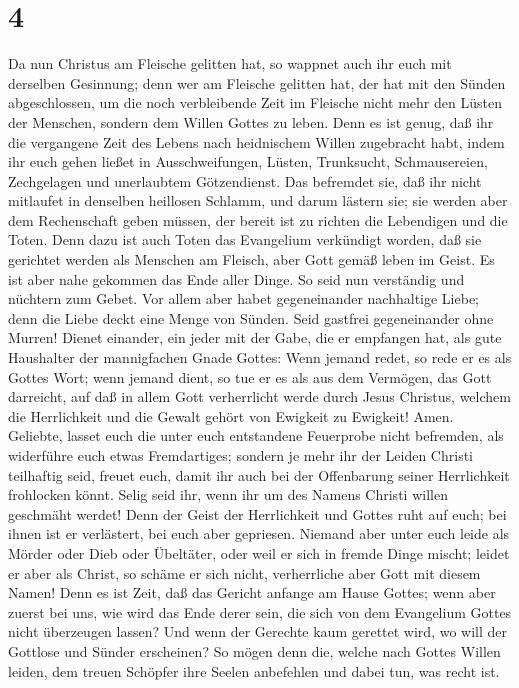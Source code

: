 \hypertarget{section-3}{%
\section{4}\label{section-3}}

 Da nun Christus am Fleische gelitten hat, so wappnet auch
ihr euch mit derselben Gesinnung; denn wer am Fleische gelitten hat, der
hat mit den Sünden abgeschlossen,  um die noch
verbleibende Zeit im Fleische nicht mehr den Lüsten der Menschen,
sondern dem Willen Gottes zu leben.  Denn es ist genug,
daß ihr die vergangene Zeit des Lebens nach heidnischem Willen
zugebracht habt, indem ihr euch gehen ließet in Ausschweifungen, Lüsten,
Trunksucht, Schmausereien, Zechgelagen und unerlaubtem Götzendienst.
 Das befremdet sie, daß ihr nicht mitlaufet in denselben
heillosen Schlamm, und darum lästern sie;  sie werden aber
dem Rechenschaft geben müssen, der bereit ist zu richten die Lebendigen
und die Toten.  Denn dazu ist auch Toten das Evangelium
verkündigt worden, daß sie gerichtet werden als Menschen am Fleisch,
aber Gott gemäß leben im Geist.  Es ist aber nahe gekommen
das Ende aller Dinge. So seid nun verständig und nüchtern zum Gebet.
 Vor allem aber habet gegeneinander nachhaltige Liebe;
denn die Liebe deckt eine Menge von Sünden.  Seid gastfrei
gegeneinander ohne Murren!  Dienet einander, ein jeder
mit der Gabe, die er empfangen hat, als gute Haushalter der mannigfachen
Gnade Gottes:  Wenn jemand redet, so rede er es als
Gottes Wort; wenn jemand dient, so tue er es als aus dem Vermögen, das
Gott darreicht, auf daß in allem Gott verherrlicht werde durch Jesus
Christus, welchem die Herrlichkeit und die Gewalt gehört von Ewigkeit zu
Ewigkeit! Amen.  Geliebte, lasset euch die unter euch
entstandene Feuerprobe nicht befremden, als widerführe euch etwas
Fremdartiges;  sondern je mehr ihr der Leiden Christi
teilhaftig seid, freuet euch, damit ihr auch bei der Offenbarung seiner
Herrlichkeit frohlocken könnt.  Selig seid ihr, wenn ihr
um des Namens Christi willen geschmäht werdet! Denn der Geist der
Herrlichkeit und Gottes ruht auf euch; bei ihnen ist er verlästert, bei
euch aber gepriesen.  Niemand aber unter euch leide als
Mörder oder Dieb oder Übeltäter, oder weil er sich in fremde Dinge
mischt;  leidet er aber als Christ, so schäme er sich
nicht, verherrliche aber Gott mit diesem Namen!  Denn es
ist Zeit, daß das Gericht anfange am Hause Gottes; wenn aber zuerst bei
uns, wie wird das Ende derer sein, die sich von dem Evangelium Gottes
nicht überzeugen lassen?  Und wenn der Gerechte kaum
gerettet wird, wo will der Gottlose und Sünder erscheinen?
 So mögen denn die, welche nach Gottes Willen leiden, dem
treuen Schöpfer ihre Seelen anbefehlen und dabei tun, was recht ist.


